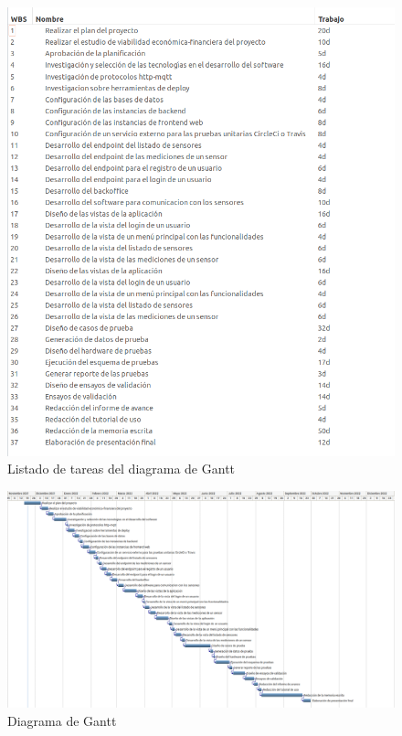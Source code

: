 \documentclass[
11pt, %
]{charter}
\begin{document}
\begin{figure}[htpb]
\centering 
\includegraphics[angle=0,height=0.7\textheight]{./Figuras/planner_tareas.png}
\caption{Listado de tareas del diagrama de Gantt }
\label{fig:diagGantt_tareas}
\end{figure}

\begin{landscape}
\begin{figure}[htpb]
\centering 
\includegraphics[angle=0,height=0.86\textheight]{./Figuras/gantt.png}
\caption{Diagrama de Gantt}
\label{fig:diagGantt}
\end{figure}
\end{landscape}
\end{document}
